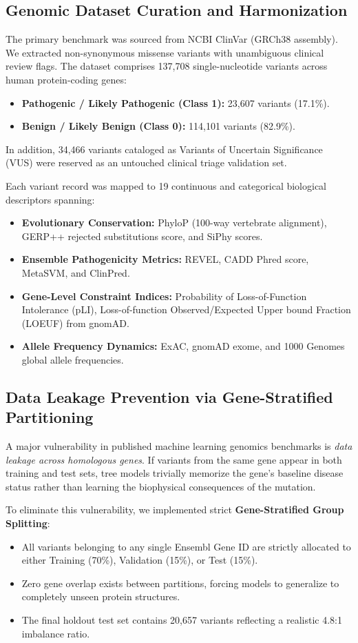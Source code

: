 \documentclass[conference]{IEEEtran}
\begin{document}
\subsection{Genomic Dataset Curation and Harmonization}
The primary benchmark was sourced from NCBI ClinVar (GRCh38 assembly). We extracted non-synonymous missense variants with unambiguous clinical review flags. The dataset comprises 137,708 single-nucleotide variants across human protein-coding genes:
\begin{itemize}
    \item \textbf{Pathogenic / Likely Pathogenic (Class 1):} 23,607 variants (17.1\%).
    \item \textbf{Benign / Likely Benign (Class 0):} 114,101 variants (82.9\%).
\end{itemize}
In addition, 34,466 variants cataloged as Variants of Uncertain Significance (VUS) were reserved as an untouched clinical triage validation set.

Each variant record was mapped to 19 continuous and categorical biological descriptors spanning:
\begin{itemize}
    \item \textbf{Evolutionary Conservation:} PhyloP (100-way vertebrate alignment), GERP++ rejected substitutions score, and SiPhy scores.
    \item \textbf{Ensemble Pathogenicity Metrics:} REVEL, CADD Phred score, MetaSVM, and ClinPred.
    \item \textbf{Gene-Level Constraint Indices:} Probability of Loss-of-Function Intolerance (pLI), Loss-of-function Observed/Expected Upper bound Fraction (LOEUF) from gnomAD.
    \item \textbf{Allele Frequency Dynamics:} ExAC, gnomAD exome, and 1000 Genomes global allele frequencies.
\end{itemize}

\subsection{Data Leakage Prevention via Gene-Stratified Partitioning}
A major vulnerability in published machine learning genomics benchmarks is \textit{data leakage across homologous genes}. If variants from the same gene appear in both training and test sets, tree models trivially memorize the gene's baseline disease status rather than learning the biophysical consequences of the mutation.

To eliminate this vulnerability, we implemented strict \textbf{Gene-Stratified Group Splitting}:
\begin{itemize}
    \item All variants belonging to any single Ensembl Gene ID are strictly allocated to either Training (70\%), Validation (15\%), or Test (15\%).
    \item Zero gene overlap exists between partitions, forcing models to generalize to completely unseen protein structures.
    \item The final holdout test set contains 20,657 variants reflecting a realistic 4.8:1 imbalance ratio.
\end{itemize}
\end{document}
